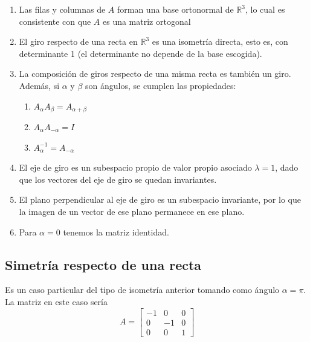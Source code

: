 \documentclass[10pt,a4paper]{article}
\theoremstyle{mystyle}
\begin{document}
\begin{enumerate}
	\item 
	Las filas y columnas de $A$ forman una base ortonormal de $\mathbb{R}^3$, lo cual es consistente con que $A$ es una matriz ortogonal
	
	\item
	
	El giro respecto de una recta en $\mathbb{R}^3$ es una isometría directa, esto es, con determinante 1 (el determinante no depende de la base escogida).
	
	\item
	
	La composición de giros respecto de una misma recta es también un giro. Además, si $\alpha$ y $\beta$ son ángulos, se cumplen las propiedades:
	
	\begin{enumerate}
		\item
		$A_{\alpha} A_{\beta} = A_{\alpha+\beta}$
		\item
		$A_{\alpha} A_{-\alpha} = I $
		\item
		$A_{\alpha}^{-1} = A_{-\alpha}$
	\end{enumerate}
	
	\item
	
	El eje de giro es un subespacio propio de valor propio asociado $\lambda = 1$, dado que los vectores del eje de giro se quedan invariantes.
	
	\item
	
	El plano perpendicular al eje de giro es un subespacio invariante, por lo que la imagen de
	un vector de ese plano permanece en ese plano.
	
	\item
	
	Para $\alpha = 0$ tenemos la matriz identidad.
	
\end{enumerate}

\subsection{Simetría respecto de una recta}

Es un caso particular del tipo de isometría anterior tomando como ángulo $\alpha = \pi$. La matriz en este caso sería  
\[
A=
\begin{bmatrix}
-1 & 0 & 0 \\
0 &  -1  & 0 \\
0 & 0 & 1
\end{bmatrix}
\]
\end{document}
